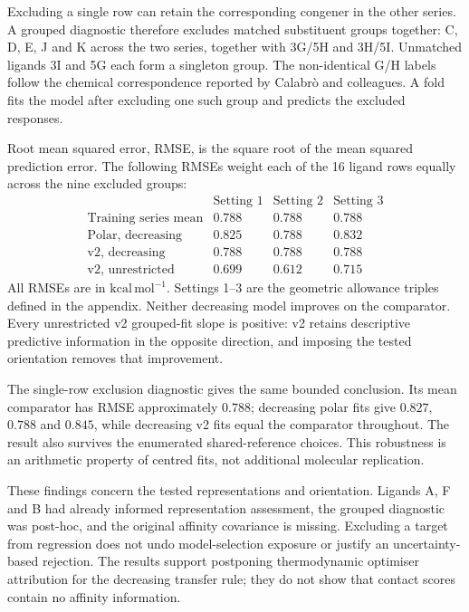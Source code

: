 \documentclass{article}
\begin{document}
Excluding a single row can retain the corresponding congener in the other series. A grouped diagnostic therefore excludes matched substituent groups together: C, D, E, J and K across the two series, together with 3G/5H and 3H/5I. Unmatched ligands 3I and 5G each form a singleton group. The non-identical G/H labels follow the chemical correspondence reported by Calabr\`o and colleagues.\cite{Q} A fold fits the model after excluding one such group and predicts the excluded responses.

Root mean squared error, RMSE, is the square root of the mean squared prediction error. The following RMSEs weight each of the 16 ligand rows equally across the nine excluded groups:
\[
\begin{array}{c|rrr}
 & \text{Setting 1} & \text{Setting 2} & \text{Setting 3}\\ \hline
\text{Training series mean} & 0.788 & 0.788 & 0.788\\
\text{Polar, decreasing} & 0.825 & 0.788 & 0.832\\
\text{v2, decreasing} & 0.788 & 0.788 & 0.788\\
\text{v2, unrestricted} & 0.699 & 0.612 & 0.715
\end{array}
\]
All RMSEs are in \(\mathrm{kcal\,mol^{-1}}\). Settings 1--3 are the geometric allowance triples defined in the appendix. Neither decreasing model improves on the comparator. Every unrestricted v2 grouped-fit slope is positive: v2 retains descriptive predictive information in the opposite direction, and imposing the tested orientation removes that improvement.

The single-row exclusion diagnostic gives the same bounded conclusion. Its mean comparator has RMSE approximately \(0.788\); decreasing polar fits give \(0.827\), \(0.788\) and \(0.845\), while decreasing v2 fits equal the comparator throughout. The result also survives the enumerated shared-reference choices. This robustness is an arithmetic property of centred fits, not additional molecular replication.

These findings concern the tested representations and orientation. Ligands A, F and B had already informed representation assessment, the grouped diagnostic was post-hoc, and the original affinity covariance is missing. Excluding a target from regression does not undo model-selection exposure or justify an uncertainty-based rejection. The results support postponing thermodynamic optimiser attribution for the decreasing transfer rule; they do not show that contact scores contain no affinity information.
\end{document}
